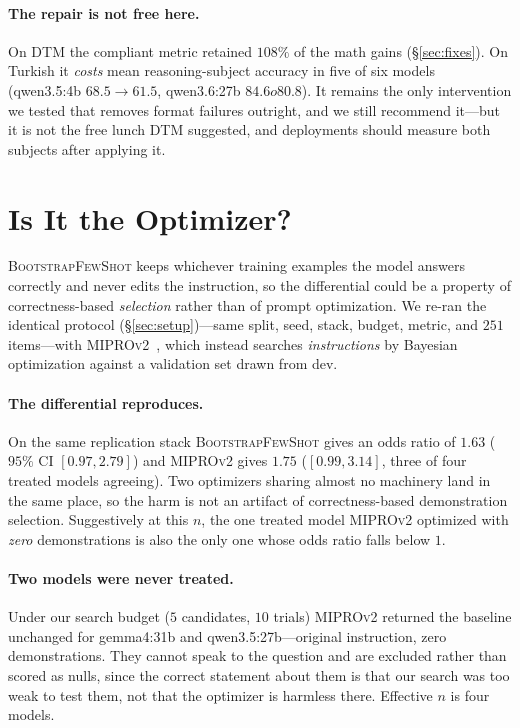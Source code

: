 \documentclass[11pt]{article}
\newcommand{\bsfs}{\textsc{BootstrapFewShot}}
\begin{document}
\paragraph{The repair is not free here.} On DTM the compliant metric retained $108\%$ of
the math gains (\S\ref{sec:fixes}). On Turkish it \emph{costs} mean reasoning-subject
accuracy in five of six models (qwen3.5:4b $68.5{\to}61.5$, qwen3.6:27b
$84.6{	o}80.8$). It remains the only intervention we tested that removes format
failures outright, and we still recommend it---but it is not the free lunch DTM
suggested, and deployments should measure both subjects after applying it.

\section{Is It the Optimizer?}\label{sec:optimizer}

\bsfs{} keeps whichever training examples the model answers correctly and never edits
the instruction, so the differential could be a property of correctness-based
\emph{selection} rather than of prompt optimization. We re-ran the identical
protocol (\S\ref{sec:setup})---same split, seed, stack, budget, metric, and $251$
items---with \textsc{MIPROv2}~\citep{opsahlong2024mipro}, which instead searches \emph{instructions}
by Bayesian optimization against a validation set drawn from dev.

\paragraph{The differential reproduces.} On the same replication stack \bsfs{} gives an
odds ratio of $1.63$ ($95\%$ CI $[0.97, 2.79]$) and \textsc{MIPROv2} gives $1.75$
($[0.99, 3.14]$, three of four treated models agreeing). Two optimizers sharing almost
no machinery land in the same place, so the harm is not an artifact of correctness-based
demonstration selection. Suggestively at this $n$, the one treated model
\textsc{MIPROv2} optimized with \emph{zero} demonstrations is also the only one whose
odds ratio falls below $1$.

\paragraph{Two models were never treated.} Under our search budget ($5$ candidates, $10$
trials) \textsc{MIPROv2} returned the baseline unchanged for gemma4:31b and
qwen3.5:27b---original instruction, zero demonstrations. They cannot speak to the
question and are excluded rather than scored as nulls, since the correct statement about
them is that our search was too weak to test them, not that the optimizer is harmless
there. Effective $n$ is four models.
\end{document}
